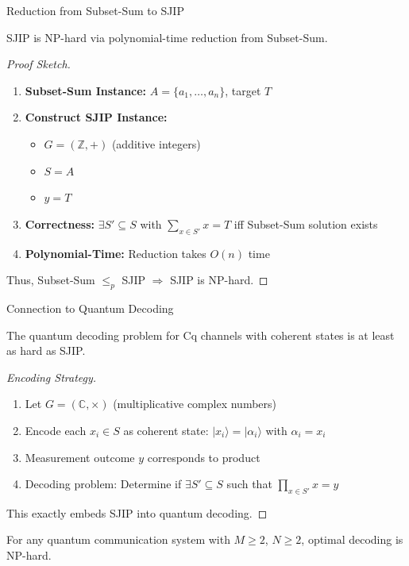 \documentclass[10pt]{beamer}
\begin{document}
\begin{frame}{Reduction from Subset-Sum to SJIP}
\begin{theorem}
SJIP is NP-hard via polynomial-time reduction from Subset-Sum.
\end{theorem}

\begin{proof}[Proof Sketch]
\begin{enumerate}
\item \textbf{Subset-Sum Instance:} $A = \{a_1, \ldots, a_n\}$, target $T$
\item \textbf{Construct SJIP Instance:}
\begin{itemize}
\item $G = (\mathbb{Z}, +)$ (additive integers)
\item $S = A$
\item $y = T$
\end{itemize}
\item \textbf{Correctness:} $\exists S' \subseteq S$ with $\sum_{x \in S'} x = T$ iff Subset-Sum solution exists
\item \textbf{Polynomial-Time:} Reduction takes $O(n)$ time
\end{enumerate}
Thus, Subset-Sum $\leq_p$ SJIP $\Rightarrow$ SJIP is NP-hard.
\end{proof}
\end{frame}

\begin{frame}{Connection to Quantum Decoding}
\begin{theorem}
The quantum decoding problem for Cq channels with coherent states is at least as hard as SJIP.
\end{theorem}

\begin{proof}[Encoding Strategy]
\begin{enumerate}
\item Let $G = (\mathbb{C}, \times)$ (multiplicative complex numbers)
\item Encode each $x_i \in S$ as coherent state: $|x_i\rangle = |\alpha_i\rangle$ with $\alpha_i = x_i$
\item Measurement outcome $y$ corresponds to product
\item Decoding problem: Determine if $\exists S' \subseteq S$ such that $\prod_{x \in S'} x = y$
\end{enumerate}
This exactly embeds SJIP into quantum decoding.
\end{proof}

\begin{corollary}
For any quantum communication system with $M \geq 2$, $N \geq 2$, optimal decoding is NP-hard.
\end{corollary}
\end{frame}
\end{document}
